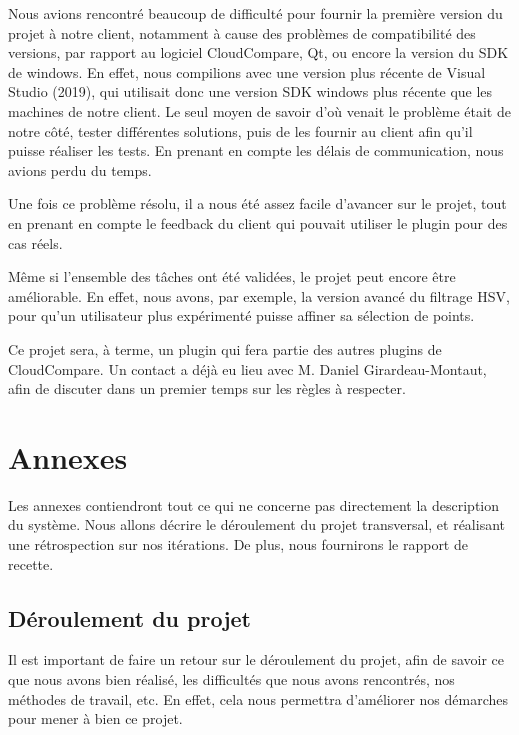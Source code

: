 \documentclass[12pt,titlepage,french]{article}
\begin{document}
Nous avions rencontré beaucoup de difficulté pour fournir la première version du projet à notre client, notamment à cause des problèmes de compatibilité des versions, par rapport au logiciel CloudCompare, Qt, ou encore la version du SDK de windows. En effet, nous compilions avec une version plus récente de Visual Studio (2019), qui utilisait donc une version SDK windows plus récente que les machines de notre client. Le seul moyen de savoir d'où venait le problème était de notre côté, tester différentes solutions, puis de les fournir au client afin qu'il puisse réaliser les tests. En prenant en compte les délais de communication, nous avions perdu du temps. \newline

Une fois ce problème résolu, il a nous été assez facile d'avancer sur le projet, tout en prenant en compte le feedback du client qui pouvait utiliser le plugin pour des cas réels. \newline

Même si l'ensemble des tâches ont été validées, le projet peut encore être améliorable. En effet, nous avons, par exemple, la version avancé du filtrage HSV, pour qu'un utilisateur plus expérimenté puisse affiner sa sélection de points. \newline

Ce projet sera, à terme, un plugin qui fera partie des autres plugins de CloudCompare. Un contact a déjà eu lieu avec M. Daniel Girardeau-Montaut, afin de discuter dans un premier temps sur les règles à respecter.

\newpage
\section{Annexes}

Les annexes contiendront tout ce qui ne concerne pas directement la description du système. Nous allons décrire le déroulement du projet transversal, et réalisant une rétrospection sur nos itérations. De plus, nous fournirons le rapport de recette.

\subsection{Déroulement du projet}

Il est important de faire un retour sur le déroulement du projet, afin de savoir ce que nous avons bien réalisé, les difficultés que nous avons rencontrés, nos méthodes de travail, etc. En effet, cela nous permettra d'améliorer nos démarches pour mener à bien ce projet.
\end{document}
